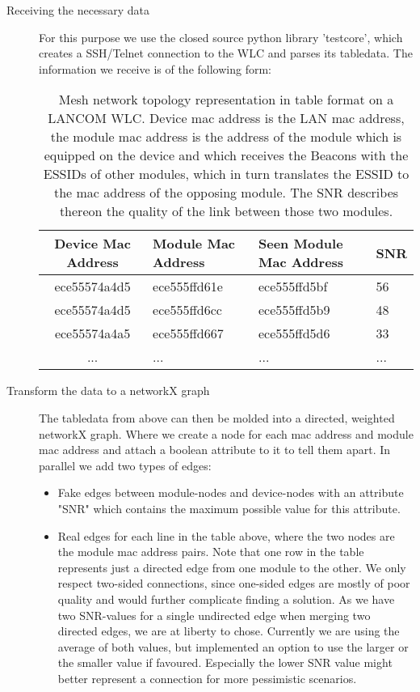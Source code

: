       \begin{description}
	\item[Receiving the necessary data]
	  For this purpose we use the closed source python library 'testcore', which creates a SSH/Telnet connection to the WLC and parses its tabledata.
	  The information we receive is of the following form:
	  \begin{table}[p]
	    \begin{tabular}{clll}
	      Device Mac Address & Module Mac Address & Seen Module Mac Address & \ac{SNR}\\ \hline
	      ece55574a4d5 & ece555ffd61e & ece555ffd5bf & 56 \\
	      ece55574a4d5 & ece555ffd6cc & ece555ffd5b9 & 48 \\
	      ece55574a4a5 & ece555ffd667 & ece555ffd5d6 & 33 \\
	      ... & ... & ... & ...
	    \end{tabular}
	    \caption{Mesh network topology representation in table format on a LANCOM WLC. Device mac address is the LAN mac address, the module mac address is
	    the address of the module which is equipped on the device and which receives the Beacons with the ESSIDs of other modules, which in turn translates
	    the ESSID to the mac address of the opposing module. The \ac{SNR} describes thereon the quality of the link between those two modules.}
	    \label{tab:wlc}
	  \end{table}
	
	  \item [Transform the data to a networkX graph]
	    The tabledata from above can then be molded into a directed, weighted networkX graph. Where we create a node for each mac address and module mac address and attach a boolean
	    attribute to it to tell them apart. 
	    In parallel we add two types of edges:
	
	    \begin{itemize}
	      \item Fake edges between module-nodes and device-nodes with an attribute "SNR" which contains the maximum possible value for this attribute.
	      
	      \item Real edges for each line in the table above, where the two nodes are the module mac address pairs. 
		Note that one row in the table represents just a directed edge from one module to the other. We only respect two-sided connections,
		since one-sided edges are mostly of poor quality and would further complicate finding a solution.
		As we have two SNR-values for a single undirected edge when merging two directed edges, we are at liberty to chose.
		Currently we are using the average of both values, but implemented an option to use the larger or the smaller value if favoured.
		Especially the lower SNR value might better represent a connection for more pessimistic scenarios.
	    \end{itemize}
	

\end{description}
